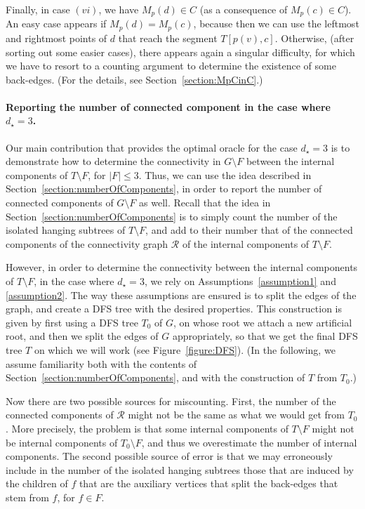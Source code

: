 \documentclass[11pt,a4paper]{article}
\begin{document}
Finally, in case $(vi)$, we have $M_p(d)\in C$ (as a consequence of $M_p(c)\in C$). An easy case appears if $M_p(d)=M_p(c)$, because then we can use the leftmost and rightmost points of $d$ that reach the segment $T[p(v),c]$. Otherwise, (after sorting out some easier cases), there appears again a singular difficulty, for which we have to resort to a counting argument to determine the existence of some back-edges. (For the details, see Section~\ref{section:MpCinC}.)

\paragraph{Reporting the number of connected component in the case where $d_{\star}=3$.}
\label{paragraph:reporting}
Our main contribution that provides the optimal oracle for the case $d_{\star}=3$ is to demonstrate how to determine the connectivity in $G\setminus F$ between the internal components of $T\setminus F$, for $|F|\leq 3$. Thus, we can use the idea described in Section~\ref{section:numberOfComponents}, in order to report the number of connected components of $G\setminus F$ as well. Recall that the idea in Section~\ref{section:numberOfComponents} is to simply count the number of the isolated hanging subtrees of $T\setminus F$, and add to their number that of the connected components of the connectivity graph $\mathcal{R}$ of the internal components of $T\setminus F$. 

However, in order to determine the connectivity between the internal components of $T\setminus F$, in the case where $d_{\star}=3$, we rely on Assumptions~\ref{assumption1} and \ref{assumption2}. The way these assumptions are ensured is to split the edges of the graph, and create a DFS tree with the desired properties. This construction is given by first using a DFS tree $T_0$ of $G$, on whose root we attach a new artificial root, and then we split the edges of $G$ appropriately, so that we get the final DFS tree $T$ on which we will work (see Figure~\ref{figure:DFS}). (In the following, we assume familiarity both with the contents of Section~\ref{section:numberOfComponents}, and with the construction of $T$ from $T_0$.)

Now there are two possible sources for miscounting. First, the number of the connected components of $\mathcal{R}$ might not be the same as what we would get from $T_0$. More precisely, the problem is that some internal components of $T\setminus F$ might not be internal components of $T_0\setminus F$, and thus we overestimate the number of internal components. The second possible source of error is that we may erroneously include in the number of the isolated hanging subtrees those that are induced by the children of $f$ that are the auxiliary vertices that split the back-edges that stem from $f$, for $f\in F$. 
\end{document}
